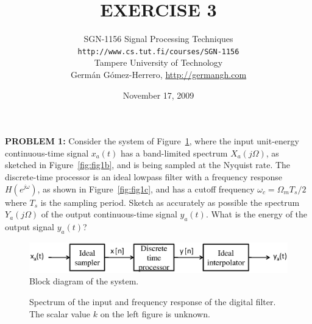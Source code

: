 \documentclass[a4paper,11pt,oneside]{article}
\title{\large{\textbf{EXERCISE 3}}}
\author{SGN-1156 Signal Processing Techniques\\
\texttt{http://www.cs.tut.fi/courses/SGN-1156}\\
Tampere University of Technology\\
Germ\'an G\'omez-Herrero, \url{http://germangh.com}}
\date{November 17, 2009}
\begin{document}
\maketitle

\noindent \textbf{PROBLEM 1:} Consider the system of Figure~\ref{fig:fig1a}, where the input unit-energy continuous-time signal $x_{a}(t)$ has a band-limited spectrum $X_{a}(j\Omega)$, as sketched in Figure~\ref{fig:fig1b}, and is being sampled at the Nyquist rate. The discrete-time processor is an ideal lowpass filter with a frequency response $H(e^{j\omega})$, as shown in Figure~\ref{fig:fig1c}, and has a cutoff frequency $\omega_{c}=\Omega_{m}T_{s}/2$ where $T_{s}$ is the sampling period. Sketch as accurately as possible the spectrum $Y_{a}(j\Omega)$ of the output continuous-time signal $y_{a}(t)$. What is the energy of the output signal $y_{a}(t)$?

\begin{figure}[h!]
\centering
\includegraphics[width=\textwidth]{fig1a.eps}
\caption{Block diagram of the system.}
\label{fig:fig1a}
\end{figure}

\begin{figure}[h!]
\centerline{
\hfil
{}
}
\caption{Spectrum of the input and frequency response of the digital filter. The scalar value $k$ on the left figure is unknown.}
\label{caca}
\end{figure}
\end{document}
